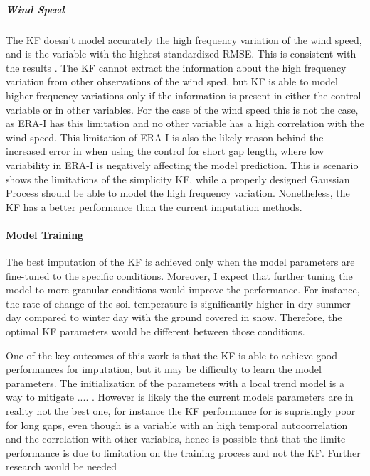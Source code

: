 \documentclass{article}
\begin{document}
\subparagraph{Wind Speed} The KF doesn't model accurately the high frequency variation of the wind speed, and is the variable with the highest standardized RMSE. This is consistent with the results \cite{vuichard_filling_2015}. The KF cannot extract the information about the high frequency variation from other observations of the wind sped, but KF is able to model higher frequency variations only if the information is present in either the control variable or in other variables. For the case of the wind speed this is not the case, as ERA-I has this limitation and no other variable has a high correlation with the wind speed. This limitation of ERA-I is also the likely reason behind the increased error in  when using the control for short gap length, where low variability in ERA-I is negatively affecting the model prediction.
This is scenario shows the limitations of the simplicity KF, while a properly designed Gaussian Process should be able to model the high frequency variation. Nonetheless, the KF has a better performance than the current imputation methods. 


\paragraph{Model Training}
The best imputation of the KF is achieved only when the model parameters are fine-tuned to the specific conditions. 
Moreover, I expect that further tuning the model to more granular conditions would improve the performance.
For instance, the rate of change of the soil temperature is significantly  higher in dry summer day compared to winter day with the ground covered in snow. Therefore, the optimal KF parameters would be different between those conditions.

One of the key outcomes of this work is that the KF is able to achieve good performances for imputation, but it may be difficulty to learn the  model parameters. The initialization of the parameters with a local trend model is a way to mitigate .... . However is likely the the current models parameters are in reality not the best one, for instance the KF performance for  is suprisingly poor for long gaps, even though is a variable with an high temporal autocorrelation and the correlation with other variables, hence is possible that that the limite performance is due to limitation on the training process and not the KF.
Further research would be needed
\end{document}

